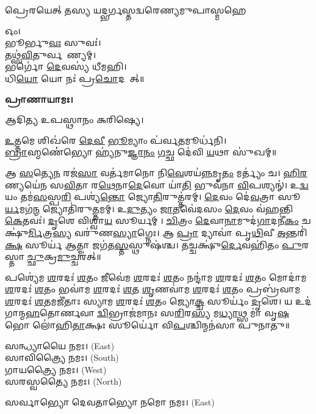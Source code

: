 {𑌪𑍍𑌰𑍇𑌰𑌯𑍇𑌤𑍍 𑌤𑌸𑍍𑌯 𑌯𑌦𑍍𑌭𑌰𑍍𑌗𑌸𑍍𑌤𑌦𑍍𑌵𑌰𑍇𑌣𑍍𑌯𑌮𑍁𑌪𑌾𑌸𑍍𑌮𑌹𑍇}


𑌓𑌂।\\
𑌭𑍂𑌰𑍍𑌭𑍁\ul{𑌵𑌃} 𑌸𑍁𑌵𑌃॑।\\
𑌤𑌥𑍍𑌸॑\ul{𑌵𑌿}𑌤𑍁𑌰𑍍𑌵𑌰𑍇᳚𑌣𑍍𑌯𑌮𑍍।\\
𑌭𑌰𑍍𑌗𑍋॑ \ul{𑌦𑍇}𑌵𑌸𑍍𑌯॑ 𑌧𑍀𑌮𑌹𑌿।\\
𑌧𑌿\ul{𑌯𑍋} 𑌯𑍋 𑌨𑌃॑ 𑌪𑍍𑌰\ul{𑌚𑍋}𑌦𑌯𑌾᳚𑌤𑍍॥

\textbf{𑌪𑍍𑌰𑌾𑌣𑌾𑌯𑌾𑌮𑌃।}


𑌆𑌦𑌿𑌤𑍍𑌯 𑌉𑌪𑌸𑍍𑌥𑌾𑌨𑌂 𑌕𑌰𑌿𑌷𑍍𑌯𑍇।

\ul{𑌉}𑌤𑍍𑌤𑌮𑍇 𑌶𑌿𑌖॑𑌰𑍇 \ul{𑌦𑍇}\ul{𑌵𑍀} \ul{𑌭𑍂}𑌮𑍍𑌯𑌾𑌂 𑌪॑𑌰𑍍𑌵\ul{𑌤}𑌮𑍂𑌰𑍍𑌧॑𑌨𑌿।\\
\ul{𑌬𑍍𑌰𑌾}𑌹𑍍𑌮𑌣𑍇॑॑𑌭𑍍𑌯𑍋 𑌹𑍍𑌯॑𑌨𑍁\ul{𑌜𑍍𑌞𑌾}\ul{𑌨𑌂} \ul{𑌗}𑌚𑍍𑌛 𑌦𑍇॑𑌵𑌿 \ul{𑌯}𑌥𑌾 𑌸𑍁॑𑌖𑌮𑍍॥



𑌆 \ul{𑌸}𑌤𑍍𑌯𑍇\ul{𑌨} 𑌰𑌜॑\ul{𑌸𑌾} 𑌵𑌰𑍍𑌤॑𑌮𑌾𑌨𑍋 𑌨𑌿\ul{𑌵𑍇}𑌶𑌯॑\ul{𑌨𑍍𑌨}𑌮𑍃\ul{𑌤𑌂} 𑌮𑌰𑍍𑌤𑍍𑌯𑌂॑ 𑌚। \ul{𑌹𑌿}\ul{𑌰}𑌣𑍍𑌯𑌯𑍇॑𑌨 𑌸\ul{𑌵𑌿}𑌤𑌾 𑌰\ul{𑌥𑍇}𑌨𑌾\ul{𑌦𑍇}𑌵𑍋 𑌯𑌾॑\ul{𑌤𑌿} 𑌭𑍁𑌵॑𑌨𑌾 \ul{𑌵𑌿}𑌪𑌶𑍍𑌯𑌨𑍍॑। 𑌉\ul{𑌦𑍍𑌵}𑌯𑌂 𑌤𑌮॑\ul{𑌸}𑌸𑍍𑌪\ul{𑌰𑌿} 𑌪𑌶𑍍𑌯॑\ul{𑌨𑍍𑌤𑍋} 𑌜𑍍𑌯𑍋\ul{𑌤𑌿}𑌰𑍁𑌤𑍍𑌤॑𑌰𑌮𑍍। \ul{𑌦𑍇}𑌵𑌂 𑌦𑍇॑\ul{𑌵}𑌤𑍍𑌰𑌾 𑌸𑍂\ul{𑌰𑍍𑌯}𑌮𑌗॑\ul{𑌨𑍍𑌮} 𑌜𑍍𑌯𑍋𑌤𑌿॑𑌰𑍁\ul{𑌤𑍍𑌤}𑌮𑌮𑍍। 𑌉\ul{𑌦𑍁}𑌤𑍍𑌯𑌂 \ul{𑌜𑌾}𑌤𑌵𑍇॑𑌦𑌸𑌂 \ul{𑌦𑍇}𑌵𑌂 𑌵॑𑌹𑌨𑍍𑌤𑌿 \ul{𑌕𑍇}𑌤𑌵𑌃॑। \ul{𑌦𑍃}𑌶𑍇 𑌵𑌿𑌶𑍍𑌵𑌾॑\ul{𑌯} 𑌸𑍂𑌰𑍍𑌯𑌮𑍍। \ul{𑌚𑌿}𑌤𑍍𑌰𑌂 \ul{𑌦𑍇}𑌵𑌾\ul{𑌨𑌾}𑌮𑍁𑌦॑\ul{𑌗𑌾}𑌦𑌨𑍀॑\ul{𑌕𑌂} 𑌚𑌕𑍍𑌷𑍁॑\ul{𑌰𑍍𑌮𑌿}𑌤𑍍𑌰\ul{𑌸𑍍𑌯} 𑌵𑌰𑍁॑𑌣\ul{𑌸𑍍𑌯𑌾}𑌗𑍍𑌨𑍇𑌃। 𑌆 \ul{𑌪𑍍𑌰𑌾} 𑌦𑍍𑌯𑌾𑌵𑌾॑ 𑌪𑍃\ul{𑌥𑌿}𑌵𑍀 \ul{𑌅}𑌨𑍍𑌤𑌰𑌿॑\ul{𑌕𑍍𑌷}\ul{} 𑌸𑍂𑌰𑍍𑌯॑ \ul{𑌆}𑌤𑍍𑌮𑌾 𑌜𑌗॑𑌤\ul{𑌸𑍍𑌤}𑌸𑍍𑌥𑍁𑌷॑𑌶𑍍𑌚। 𑌤𑌚𑍍𑌚𑌕𑍍𑌷𑍁॑\ul{𑌰𑍍𑌦𑍇}𑌵𑌹𑌿॑𑌤𑌂 \ul{𑌪𑍁}𑌰𑌸𑍍𑌤𑌾\ul{𑌚𑍍𑌛𑍁}𑌕𑍍𑌰\ul{𑌮𑍁}𑌚𑍍𑌚𑌰॑𑌤𑍍॥

𑌪𑌶𑍍𑌯𑍇॑𑌮 \ul{𑌶}𑌰𑌦𑌃॑ \ul{𑌶}𑌤𑌂 𑌜𑍀𑌵𑍇॑𑌮 \ul{𑌶}𑌰𑌦𑌃॑ \ul{𑌶}𑌤𑌂 𑌨𑌨𑍍𑌦𑌾॑𑌮 \ul{𑌶}𑌰𑌦𑌃॑ \ul{𑌶}𑌤𑌂 𑌮𑍋𑌦𑌾॑𑌮 \ul{𑌶}𑌰𑌦𑌃॑ \ul{𑌶}𑌤𑌂 𑌭𑌵𑌾॑𑌮 \ul{𑌶}𑌰𑌦𑌃॑ \ul{𑌶}𑌤 \ul{𑌶𑍃}𑌣𑌵𑌾॑𑌮 \ul{𑌶}𑌰𑌦𑌃॑ \ul{𑌶}𑌤𑌂 𑌪𑍍𑌰𑌬𑍍𑌰॑𑌵𑌾𑌮 \ul{𑌶}𑌰𑌦𑌃॑ \ul{𑌶}𑌤𑌮𑌜𑍀॑𑌤𑌾𑌃 𑌸𑍍𑌯𑌾𑌮 \ul{𑌶}𑌰𑌦𑌃॑ \ul{𑌶}𑌤𑌂 𑌜𑍍𑌯𑍋\ul{𑌕𑍍𑌚} 𑌸𑍂𑌰𑍍𑌯𑌂॑ \ul{𑌦𑍃}𑌶𑍇। 𑌯 𑌉𑌦॑𑌗𑌾𑌨𑍍𑌮\ul{𑌹}𑌤𑍋𑌰𑍍𑌣𑌵𑌾\ul{𑌦𑍍𑌵𑌿}𑌭𑍍𑌰𑌾𑌜॑𑌮𑌾𑌨𑌃 𑌸\ul{𑌰𑌿}𑌰\ul{𑌸𑍍𑌯} 𑌮\ul{𑌧𑍍𑌯𑌾}𑌥𑍍𑌸 𑌮𑌾॑ 𑌵𑍃\ul{𑌷}𑌭𑍋 𑌲𑍋॑𑌹𑌿\ul{𑌤𑌾}𑌕𑍍𑌷𑌃 𑌸𑍂𑌰𑍍𑌯𑍋॑ 𑌵𑌿\ul{𑌪}𑌶𑍍𑌚𑌿𑌨𑍍𑌮𑌨॑𑌸𑌾 𑌪𑍁𑌨𑌾𑌤𑍁॥



𑌸𑌨𑍍𑌧𑍍𑌯𑌾𑌯𑍈 𑌨𑌮𑌃।  {\scriptsize (East)}\\
𑌸𑌾𑌵𑌿𑌤𑍍𑌰𑍍𑌯𑍈 𑌨𑌮𑌃। {\scriptsize (South)}\\
𑌗𑌾𑌯𑌤𑍍𑌰𑍍𑌯𑍈 𑌨𑌮𑌃।  {\scriptsize (West)}\\
𑌸𑌰𑌸𑍍𑌵𑌤𑍍𑌯𑍈 𑌨𑌮𑌃।  {\scriptsize (North)}

𑌸𑌰𑍍𑌵𑌾𑌭𑍍𑌯𑍋 𑌦𑍇𑌵𑌤𑌾𑌭𑍍𑌯𑍋 𑌨𑌮𑍋 𑌨𑌮𑌃। {\scriptsize (East)}


